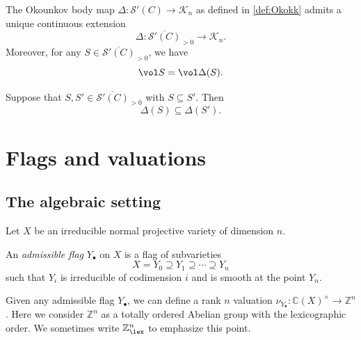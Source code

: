 \begin{theorem}\label{thm:Okocont}
	The Okounkov body map $\Delta\colon \mathcal{S}'(C) \rightarrow \mathcal{K}_n$
    as defined in \cref{def:Okokk} admits a unique continuous extension
	\begin{equation}\label{eq:Deltagensg}
		\Delta \colon \overline{\mathcal{S}'(C)}_{>0}\rightarrow \mathcal{K}_n.
	\end{equation}
     Moreover, for any $S\in \overline{\mathcal{S}'(C)}_{>0}$, we have
	\begin{equation}\label{eq:volWfinal}
		\vol S=\vol \Delta(S).
	\end{equation}
\end{theorem}




\begin{corollary}\label{cor:Okocomp}
    Suppose that $S,S'\in \overline{\mathcal{S}'(C)}_{>0}$ with $S\subseteq S'$. Then
    \begin{equation}\label{eq:Deltacontain}
    \Delta(S)\subseteq \Delta(S').
    \end{equation}
\end{corollary}

\section{Flags and valuations}\label{sec:flag}

\subsection{The algebraic setting}\label{subsec:flagvalalgebraic}
Let $X$ be an irreducible normal projective variety of dimension $n$.
\begin{definition}\label{def:admfl}
	An \emph{admissible flag} $Y_{\bullet}$ on $X$ is a flag of subvarieties
	\[
		X=Y_0\supseteq Y_1\supseteq \cdots\supseteq Y_n
	\]
	such that $Y_i$ is irreducible of codimension $i$ and is smooth at the point $Y_n$.
\end{definition}


Given any admissible flag $Y_{\bullet}$, we can define a rank $n$ valuation $\nu_{Y_{\bullet}}\colon \mathbb{C}(X)^{\times}\rightarrow \mathbb{Z}^n$. Here we consider $\mathbb{Z}^n$ as a totally ordered Abelian group with the lexicographic order.
We sometimes write $\mathbb{Z}^n_{\lex}$ to emphasize this point.

